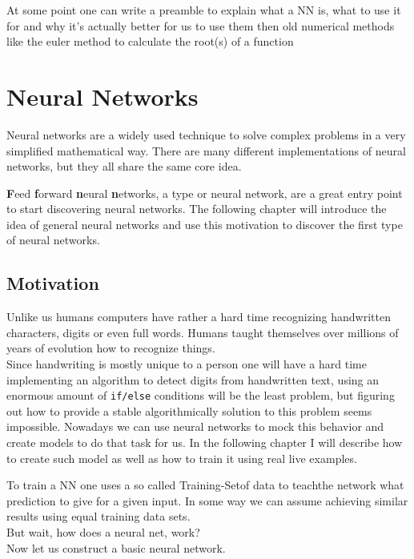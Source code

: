 \documentclass[10pt]{book}
\title{\ueberschrift}
\author{Philipp Zettl}
\begin{document}
    \pagestyle{fancy}
    \maketitle

    At some point one can write a preamble to explain what a NN is, what to use it for
    and why it's actually better for us to use them then old numerical methods like the euler method to
    calculate the root(s) of a function

    \chapter{Neural Networks}
    Neural networks are a widely used technique to solve complex problems in a very simplified mathematical
    way. There are many different implementations of neural networks, but they all share the same core idea.

    \textbf{F}eed \textbf{f}orward \textbf{n}eural \textbf{n}etworks, a type or neural network, are a great entry point to start discovering
    neural networks. The following chapter will introduce the idea of general neural networks and use this motivation
    to discover the first type of neural networks.
    \section{Motivation}
    Unlike us humans computers have rather a hard time recognizing handwritten characters, digits or even full words.
    Humans taught themselves over millions of years of evolution how to recognize things.\\
    Since handwriting is mostly unique to a person one will have a hard time implementing an algorithm to detect digits from handwritten text,
    using an enormous amount of \lstinline{if/else} conditions will be the least problem, but figuring out how to provide a stable algorithmically solution
    to this problem seems impossible.
    Nowadays we can use neural networks to mock this behavior and create models to do that task for us.
    In the following chapter I will describe how to create such model as well as how to train it using real live
    examples.

    To train a NN one uses a so called \dq Training-Set\dq of data to \dq teach\dq the network what prediction to give for a given input. In some way we can assume
    achieving similar results using equal training data sets.\\
    But wait, how does a neural net, work?\\    
    Now let us construct a basic neural network.
\end{document}
